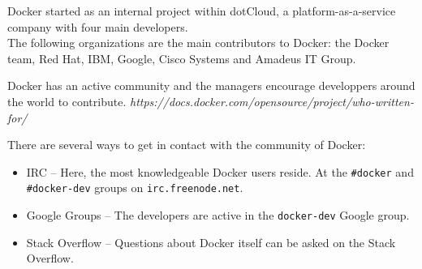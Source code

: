 Docker started as an internal project within dotCloud, a platform-as-a-service company with four main developers. \\
The following organizations are the main contributors to Docker: the Docker team, Red Hat, IBM, Google, Cisco Systems and Amadeus IT Group. 

Docker has an active community and the managers encourage developpers around the world to contribute. 
\textit{https://docs.docker.com/opensource/project/who-written-for/}

There are several ways to get in contact with the community of Docker:
\begin{itemize}
\item IRC -- Here, the most knowledgeable Docker users reside. At the \verb|#docker| and \verb|#docker-dev| groups on \verb|irc.freenode.net|.

\item Google Groups -- The developers are active in the \verb|docker-dev| Google group.

\item Stack Overflow -- Questions about Docker itself can be asked on the Stack Overflow. 

\end{itemize}

